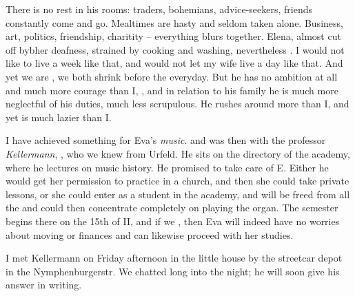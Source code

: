 There is no rest in his rooms: traders, bohemians, advice-seekers, friends constantly come and go. Mealtimes are hasty and seldom taken alone. Business, art, politics, friendship, charitity -- everything blurs together. Elena, almost cut off bybher deafness, strained by cooking and washing, nevertheless . I would not like to live a week like that, and would not let my wife live a day like that. And yet we are , we both shrink before the everyday. But he has no ambition at all and much more courage than I, , and in relation to his family he is much more neglectful of his duties, much less scrupulous. He rushes around more than I, and yet is much lazier than I.

I have achieved something for Eva's \textit{music}.  and was then with the professor \textit{Kellermann}, , who we knew from Urfeld. He sits on the directory of the academy, where he lectures on music history. He promised to take care of E. Either he would get her permission to practice in a church, and then she could take private lessons, or she could enter as a student in the academy, and will be freed from all the  and could then concentrate completely on playing the organ. The semester begins there on the 15th of II, and if we , then Eva will indeed have no worries about moving or finances and can likewise proceed with her studies.

I met Kellermann on Friday afternoon in the little house by the streetcar depot in the Nymphenburgerstr. We chatted long into the night; he will soon give his answer in writing.


